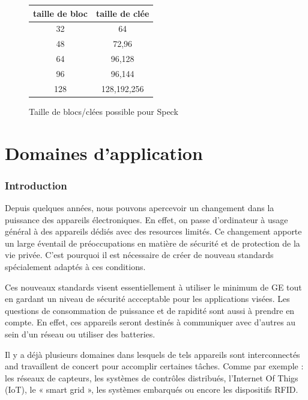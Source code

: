 			\vspace{0.5cm}

			\begin{figure}[!h]
				\centering
				\begin{tabular}{cc}
					taille de bloc & taille de clée \\
					\hline
					32 & 64 \\
					\hline
					48 & 72,96 \\
					\hline
					64 & 96,128 \\
					\hline
					96 & 96,144 \\
					\hline
					128 & 128,192,256 \\
					\hline
				\end{tabular}
				\caption{Taille de blocs/clées possible pour Speck}
			 	\label{tailleSpeck}
			\end{figure}

			\vspace{0.5cm}

			\part{Domaines d'application}

			\section{Introduction}


			Depuis quelques années, nous pouvons apercevoir un changement dans la puissance des appareils électroniques.
			En effet, on passe d'ordinateur à usage général à des appareils dédiés avec des resources limités.
			Ce changement apporte un large éventail de préoccupations en matière de sécurité et de protection de la vie privée.
			C'est pourquoi il est nécessaire de créer de nouveau standards spécialement adaptés à ces conditions.
			
			Ces nouveaux standards visent essentiellement à utiliser le minimum de GE tout en gardant un niveau de sécurité accceptable pour les applications visées.
			Les questions de consommation de puissance et de rapidité sont aussi à prendre en compte.
			En effet, ces appareils seront destinés à communiquer avec d'autres au sein d'un réseau ou utiliser des batteries.
			
			Il y a déjà plusieurs domaines dans lesquels de tels appareils sont interconnectés and travaillent de concert pour accomplir certaines tâches.
			Comme par exemple : les réseaux de capteurs, les systèmes de contrôles distribués, l'Internet Of Thigs (IoT), le « smart grid », les systèmes embarqués ou encore les dispositifs RFID.
			
